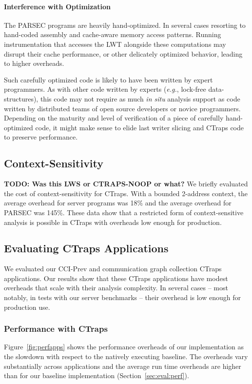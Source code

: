 \documentclass[preprint,9pt]{sigplanconf}
\newcommand{\ctraps}{CTraps\xspace}
\newcommand{\lwt}{LWT\xspace}
\begin{document}
\paragraph{Interference with Optimization}
The PARSEC programs are heavily hand-optimized. In several cases
resorting to hand-coded assembly and cache-aware memory access patterns.
Running instrumentation that accesses the \lwt alongside these computations may
disrupt their cache performance, or other delicately optimized behavior,
leading to higher overheads.  

Such carefully optimized code is likely to have been written by expert
programmers.  As with other code written by experts ({\em e.g.}, lock-free
data-structures), this code may not require as much {\em in situ} analysis
support as code written by distributed teams of open source developers or
novice programmers.  Depending on the maturity and level of verification of a
piece of carefully hand-optimized code, it might make sense to elide 
last writer slicing and \ctraps code to preserve performance. 
 

\subsection{Context-Sensitivity}
{\bf TODO: Was this LWS or CTRAPS-NOOP or what?}
We briefly evaluated the cost of context-sensitivity for \ctraps.  With a
bounded 2-address context, the average overhead for server programs was 18\%
and the average overhead for PARSEC was 145\%.  These data show that a
restricted form of context-sensitive analysis is possible in \ctraps with
overheads low enough for production.  


\subsection{Evaluating CTraps Applications}
\label{sec:appperf}
We evaluated our CCI-Prev and communication graph collection CTraps
applications.  Our results show that these CTraps applications have modest
overheads that scale with their analysis complexity.  In several cases -- most
notably, in tests with our server benchmarks -- their overhead is low enough
for production use.  

\subsubsection{Performance with \ctraps}

 Figure~\ref{fig:perfapps} shows the performance overheads of
our implementation as the slowdown with respect to the natively executing
baseline.  The overheads vary substantially across applications and the average
run time overheads are higher than for our baseline implementation
(Section~\ref{sec:eval:perf}). 
  
\end{document}
